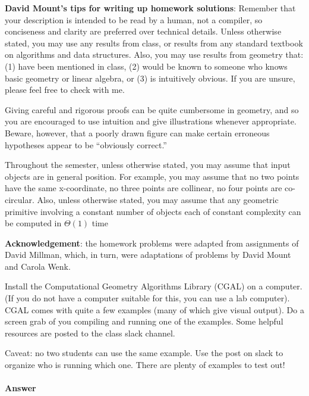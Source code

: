 \documentclass{article}
\begin{document}
{\bf David Mount's tips for writing up homework solutions}:
Remember that your description is intended to be read by a
human, not a compiler, so conciseness and clarity are preferred over technical
details.  Unless otherwise stated, you may use any results from class, or
results from any standard textbook on algorithms and data structures. Also, you
may use results from geometry that: (1) have been mentioned in class, (2) would
be known to someone who knows basic geometry or linear algebra, or (3) is
intuitively obvious. If you are unsure, please feel free to check with me.

Giving careful and rigorous proofs can be quite cumbersome in geometry, and so
you are encouraged to use intuition and give illustrations whenever appropriate.
Beware, however, that a poorly drawn figure can make certain erroneous
hypotheses appear to be ``obviously correct.''

Throughout the semester, unless otherwise stated, you may assume that input
objects are in general position. For example, you may assume that no two points
have the same x-coordinate, no three points are collinear, no four points are
co-circular. Also, unless otherwise stated, you may assume that any geometric
primitive involving a constant number of objects each of constant complexity can
be computed in $\Theta(1)$ time


{\bf Acknowledgement}: the homework problems were adapted from assignments of David
Millman, which, in turn, were adaptations of problems by David Mount and Carola
Wenk.

\collab{\todo{}}

Install the Computational Geometry Algorithms Library (CGAL) on a computer.  (If
you do not have a computer suitable for this, you can use a lab computer). CGAL
comes with quite a few examples (many of which give visual output). Do a screen
grab of you compiling and running one of the examples.  Some helpful resources
are posted to the class slack channel.

Caveat: no two students can use the same example.  Use the post on slack to
organize who is running which one.  There are plenty of examples to test out!

\paragraph{Answer}

\end{document}
